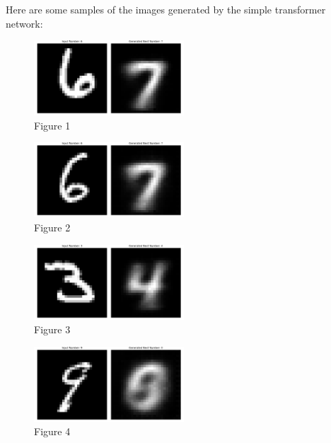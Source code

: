 \documentclass[lettersize,journal]{IEEEtran}
\begin{document}
Here are some samples of the images generated by the simple transformer network:
\begin{figure}[H]   
    \centering
    \includegraphics[width=0.5\textwidth]{media/Figure_1.png}
    \caption{Figure 1}
\end{figure}
\begin{figure}[H]   
    \centering
    \includegraphics[width=0.5\textwidth]{media/Figure_2.png}
    \caption{Figure 2} 
\end{figure}
\begin{figure}[H]   
    \centering
    \includegraphics[width=0.5\textwidth]{media/Figure_3.png}
    \caption{Figure 3}
\end{figure}
\begin{figure}[H]   
    \centering
    \includegraphics[width=0.5\textwidth]{media/Figure_4.png}
    \caption{Figure 4}
\end{figure}

\end{document}
